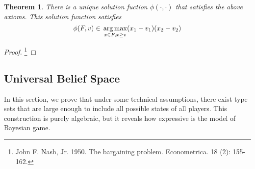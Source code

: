 \documentclass{article}
\newtheorem{Thm}{Theorem}[section]
\theoremstyle{definition}
\begin{document}
\begin{Thm}
    There is a unique solution fuction $\phi(\cdot,\cdot)$ that satisfies the above axioms.
    This solution function satisfies \[\phi(F,v)\in\sideset{}{}{\arg\max}_{x\in F,x\ge v}(x_1-v_1)(x_2-v_2)\]
\end{Thm}
\begin{proof}
    \footnote{John F. Nash, Jr. 1950. The bargaining problem. Econometrica. 18 (2): 155-162.}
\end{proof}
\subsection{Universal Belief Space}
In this section, we prove that under some technical assumptions, there exist type sets that are large enough
to include all possible states of all players. This construction is purely algebraic, but it reveals how expressive
is the model of Bayesian game.
\end{document}
